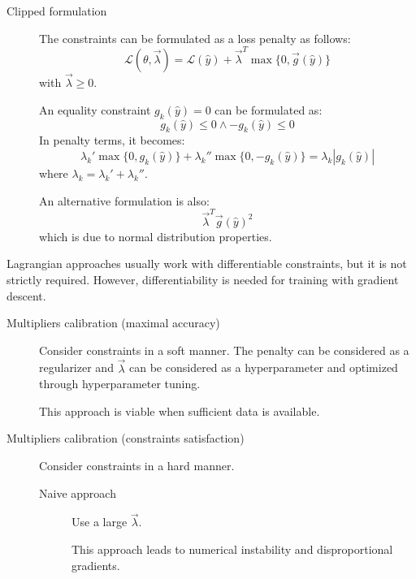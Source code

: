 \begin{description}
\begin{description}
            \item[Clipped formulation] 
                The constraints can be formulated as a loss penalty as follows:
                \[ \mathcal{L}(\theta, \vec{\lambda}) = \mathcal{L}(\hat{y}) + \vec{\lambda}^T \max\{ 0, \vec{g}(\hat{y}) \} \]
                with $\vec{\lambda} \geq 0$.

                \begin{remark}
                    An equality constraint $g_k(\hat{y}) = 0$ can be formulated as:
                    \[ 
                        g_k(\hat{y}) \leq 0 \land -g_k(\hat{y}) \leq 0  
                    \]
                    In penalty terms, it becomes:
                    \[
                        \lambda_k' \max \{ 0, g_k(\hat{y}) \} + \lambda_k'' \max \{ 0, -g_k(\hat{y}) \} = \lambda_k | g_k(\hat{y}) |
                    \]
                    where $\lambda_k = \lambda_k' + \lambda_k''$.

                    An alternative formulation is also:
                    \[ \vec{\lambda}^T \vec{g}(\hat{y})^2 \]
                    which is due to normal distribution properties.
                \end{remark}
        \end{description}

        \begin{remark}
            Lagrangian approaches usually work with differentiable constraints, but it is not strictly required. However, differentiability is needed for training with gradient descent.
        \end{remark}

        \begin{description}
            \item[Multipliers calibration (maximal accuracy)]
                Consider constraints in a soft manner. The penalty can be considered as a regularizer and $\vec{\lambda}$ can be considered as a hyperparameter and optimized through hyperparameter tuning.

                \begin{remark}
                    This approach is viable when sufficient data is available.
                \end{remark}

            \item[Multipliers calibration (constraints satisfaction)]
                Consider constraints in a hard manner.

                \begin{description}
                    \item[Naive approach] 
                        Use a large $\vec{\lambda}$.
                        \begin{remark}
                            This approach leads to numerical instability and disproportional gradients.
                        \end{remark}


\end{description}
\end{description}
\end{description}

